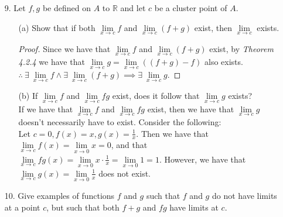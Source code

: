 \documentclass[12pt,letterpaper]{article}
\newcommand{\R}{\mathbb{R}}
\theoremstyle{case}
\theoremstyle{definition}
\begin{document}
\begin{enumerate}
\begin{enumerate}
\begin{proof}
				$\therefore$ We have that if $\lim\limits_{x \to c} f(x) = L$ and $\lim\limits_{x \to c} g(x) = M$, then $\lim\limits_{x \to c} (f+g)(x) = L + M$.\\
				
				A similar argument can be used to show the case for subtraction.
			\end{proof}
			
			\item[9.] Let $f,g$ be defined on $A$ to $\R$ and let $c$ be a cluster point of $A$.
				\begin{enumerate}
					\item[(a)] Show that if both $\lim\limits_{x \to c} f$ and $\lim\limits_{x \to c}(f+g)$ exist, then $\lim\limits_{x \to c}$ exists.\\
					
					\begin{proof}
						Since we have that $\lim\limits_{x \to c} f$ and $\lim\limits_{x \to c} (f+g)$ exist, by \textit{Theorem 4.2.4} we have that $\lim\limits_{x \to c} g=\lim\limits_{x \to c} ((f + g)-f)$ also exists.\\
						
						$\therefore\ \exists\ \lim\limits_{x \to c} f \wedge \exists\ \lim\limits_{x \to c} (f+g) \implies \exists\ \lim\limits_{x \to c} g$.
					\end{proof}
					
					\item[(b)] If $\lim\limits_{x \to c} f$ and $\lim\limits_{x \to c} fg$ exist, does it follow that $\lim\limits_{x \to c} g$ exists?\\
					
					If we have that $\lim\limits_{x \to c} f$ and $\lim\limits_{x \to c} fg$ exist, then we have that $\lim\limits_{x \to c}g$ doesn't necessarily have to exist. Consider the following:\\
					
					Let $c=0, f(x)=x,g(x)=\frac{1}{x}$. Then we have that $\lim\limits_{x \to c} f(x)=\lim\limits_{x \to 0} x = 0$, and that $\lim\limits_{x \to c}fg(x) = \lim\limits_{x \to 0} x \cdot \frac{1}{x} = \lim\limits_{x \to 0} 1 = 1$. However, we have that $\lim\limits_{x \to c} g(x) = \lim\limits_{x \to 0} \frac{1}{x}$ does not exist.\\
				\end{enumerate}
			
			\item[10.] Give examples of functions $f$ and $g$ such that $f$ and $g$ do not have limits at a point $c$, but such that both $f+g$ and $fg$ have limits at $c$.\\
			

\end{enumerate}
\end{enumerate}
\end{document}
